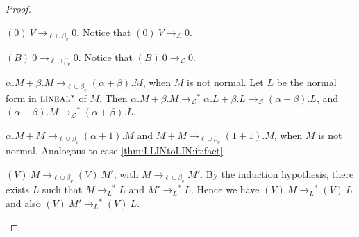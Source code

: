 \documentclass{LMCS}
\newcommand{\olin}{\mbox{\sc lineal}}
\newcommand{\xto}[1]{\ensuremath{\rightarrow_{#1}}}
\newcommand{\toolin}{\xto{\mathcal{L}}}
\newcommand{\stoolin}{\ensuremath{\xto{L}^{\ast}}}
\newcommand{\toblinred}{\xto{\ell\cup\beta_v}}
\begin{document}
\begin{proof}
\begin{myenumerate}
    \item $(0)~V\toblinred 0$. Notice that $(0)~V\toolin 0$.

    \item $(B)~0\toblinred 0$. Notice that $(B)~0\toolin 0$.

    \item\label{thm:LLINtoLIN:it:fact} $\alpha.M+\beta.M\toblinred(\alpha+\beta).M$, when $M$ is not normal. Let $L$ be the normal form in $\olin^*$ of $M$. Then $\alpha.M+\beta.M\toolin^*\alpha.L+\beta.L\toolin(\alpha+\beta).L$, and $(\alpha+\beta).M\toolin^*(\alpha+\beta).L$.
    \item $\alpha.M+M\toblinred(\alpha+1).M$ and $M+M\toblinred(1+1).M$, when $M$ is not normal. Analogous to case \ref{thm:LLINtoLIN:it:fact}.
    \item $(V)~M\toblinred(V)~M'$, with $M\toblinred M'$. By the induction hypothesis, there exists $L$ such that $M\stoolin L$ and $M' \stoolin L$. Hence we have $(V)~M\stoolin(V)~L$ and also $(V)~M'\stoolin(V)~L$. \qedhere
  \end{myenumerate}
\end{proof}
\end{document}
